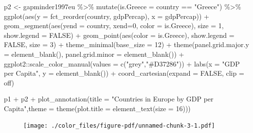 \documentclass[
  letterpaper,
]{book}
\newenvironment{Shaded}{\begin{snugshade}}{\end{snugshade}}
\newcommand{\AttributeTok}[1]{\textcolor[rgb]{0.40,0.45,0.13}{#1}}
\newcommand{\ConstantTok}[1]{\textcolor[rgb]{0.56,0.35,0.01}{#1}}
\newcommand{\DecValTok}[1]{\textcolor[rgb]{0.68,0.00,0.00}{#1}}
\newcommand{\FunctionTok}[1]{\textcolor[rgb]{0.28,0.35,0.67}{#1}}
\newcommand{\NormalTok}[1]{\textcolor[rgb]{0.00,0.23,0.31}{#1}}
\newcommand{\OtherTok}[1]{\textcolor[rgb]{0.00,0.23,0.31}{#1}}
\newcommand{\SpecialCharTok}[1]{\textcolor[rgb]{0.37,0.37,0.37}{#1}}
\newcommand{\StringTok}[1]{\textcolor[rgb]{0.13,0.47,0.30}{#1}}
\begin{document}
\begin{Shaded}
\begin{Highlighting}[]
\NormalTok{p2 }\OtherTok{\textless{}{-}}\NormalTok{ gapminder1997eu }\SpecialCharTok{\%\textgreater{}\%} 
  \FunctionTok{mutate}\NormalTok{(}\AttributeTok{is.Greece =}\NormalTok{ country }\SpecialCharTok{==} \StringTok{"Greece"}\NormalTok{) }\SpecialCharTok{\%\textgreater{}\%}
  \FunctionTok{ggplot}\NormalTok{(}\FunctionTok{aes}\NormalTok{(}\AttributeTok{y =} \FunctionTok{fct\_reorder}\NormalTok{(country, gdpPercap), }\AttributeTok{x =}\NormalTok{ gdpPercap)) }\SpecialCharTok{+} 
  \FunctionTok{geom\_segment}\NormalTok{(}\FunctionTok{aes}\NormalTok{(}\AttributeTok{yend =}\NormalTok{ country, }\AttributeTok{xend=}\DecValTok{0}\NormalTok{, }\AttributeTok{color =}\NormalTok{ is.Greece), }\AttributeTok{size =} \DecValTok{1}\NormalTok{, }\AttributeTok{show.legend =} \ConstantTok{FALSE}\NormalTok{) }\SpecialCharTok{+}
  \FunctionTok{geom\_point}\NormalTok{(}\FunctionTok{aes}\NormalTok{(}\AttributeTok{color =}\NormalTok{ is.Greece), }\AttributeTok{show.legend =} \ConstantTok{FALSE}\NormalTok{, }\AttributeTok{size =} \DecValTok{3}\NormalTok{) }\SpecialCharTok{+} 
  \FunctionTok{theme\_minimal}\NormalTok{(}\AttributeTok{base\_size =} \DecValTok{12}\NormalTok{) }\SpecialCharTok{+} 
  \FunctionTok{theme}\NormalTok{(}\AttributeTok{panel.grid.major.y =} \FunctionTok{element\_blank}\NormalTok{(),}
        \AttributeTok{panel.grid.minor =} \FunctionTok{element\_blank}\NormalTok{()) }\SpecialCharTok{+}
\NormalTok{  ggplot2}\SpecialCharTok{::}\FunctionTok{scale\_color\_manual}\NormalTok{(}\AttributeTok{values =} \FunctionTok{c}\NormalTok{(}\StringTok{"grey"}\NormalTok{,}\StringTok{"\#D37286"}\NormalTok{)) }\SpecialCharTok{+}
  \FunctionTok{labs}\NormalTok{(}\AttributeTok{x =} \StringTok{"GDP per Capita"}\NormalTok{, }\AttributeTok{y =} \FunctionTok{element\_blank}\NormalTok{()) }\SpecialCharTok{+} 
  \FunctionTok{coord\_cartesian}\NormalTok{(}\AttributeTok{expand =} \ConstantTok{FALSE}\NormalTok{, }\AttributeTok{clip =} \StringTok{\textquotesingle{}off\textquotesingle{}}\NormalTok{)}

\NormalTok{p1 }\SpecialCharTok{+}\NormalTok{ p2 }\SpecialCharTok{+} \FunctionTok{plot\_annotation}\NormalTok{(}\AttributeTok{title =} \StringTok{"Countries in Europe by GDP per Capita"}\NormalTok{,}\AttributeTok{theme =} \FunctionTok{theme}\NormalTok{(}\AttributeTok{plot.title =} \FunctionTok{element\_text}\NormalTok{(}\AttributeTok{size =} \DecValTok{16}\NormalTok{)))}
\end{Highlighting}
\end{Shaded}

\begin{figure}[H]

{\centering \texttt{[image: ./color\_files/figure-pdf/unnamed-chunk-3-1.pdf]}

}

\end{figure}
\end{document}
